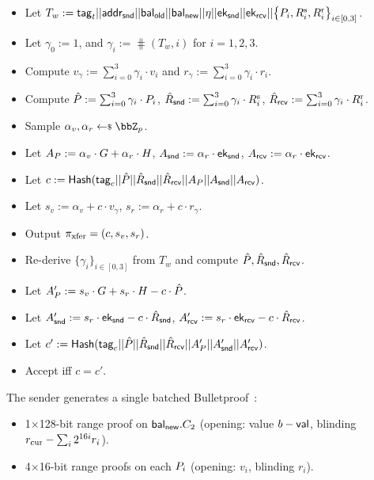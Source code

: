 \two
{}
%
\begin{itemize}[itemsep=.5pt]
    \item Let $T_w := \mathsf{tag}_t \vert\vert {\ensuremath{\mathsf{addr}}}_{\sf snd} \vert\vert \mathsf{bal}_{\mathsf{old}} \vert\vert \mathsf{bal}_{\mathsf{new}} \vert\vert \eta \vert\vert \textsf{ek}_{\mathsf{snd}} \vert\vert \textsf{ek}_{\mathsf{rcv}} \vert\vert \bigl\{P_{i}, R^{\rm s}_{i}, R^{\rm r}_{i}\bigr\}_{i \in [0,3]}$.
    \item Let $\gamma_0 := 1$, and $\gamma_i := \hash(T_w, i)$ for $i = 1, 2, 3$.
    \item Compute $v_\gamma := \sum_{i=0}^{3} \gamma_i \cdot v_i$ and $r_\gamma := \sum_{i=0}^{3} \gamma_i \cdot r_i$.
    \item Compute $\hat{P} := \sum_{i=0}^{3} \gamma_i \cdot P_{i}$, $\hat{R}_{\sf snd} := \sum_{i=0}^{3} \gamma_i \cdot R^{\rm s}_{i}$, $\hat{R}_{\sf rcv} := \sum_{i=0}^{3} \gamma_i \cdot R^{\rm r}_{i}$.
\end{itemize}

\two
{}
%
\begin{itemize}[itemsep=.5pt]
    \item Sample $\alpha_v, \alpha_r \getsr \Z_p$.
    \item Let $A_P := \alpha_v \cdot G + \alpha_r \cdot H$, $A_{\sf snd} := \alpha_r \cdot \textsf{ek}_{\mathsf{snd}}$, $A_{\sf rcv} := \alpha_r \cdot \textsf{ek}_{\mathsf{rcv}}$.
    \item Let $c := \mathsf{Hash}(\mathsf{tag}_c \vert\vert \hat{P} \vert\vert \hat{R}_{\sf snd} \vert\vert \hat{R}_{\sf rcv} \vert\vert A_P \vert\vert A_{\sf snd} \vert\vert A_{\sf rcv})$.
    \item Let $s_v := \alpha_v + c \cdot v_\gamma$, $s_r := \alpha_r + c \cdot r_\gamma$.
    \item Output $\pi_{\rm xfer} = (c, s_v, s_r)$.
\end{itemize}

\two
{}
\begin{itemize}[itemsep=0.5pt]
    \item Re-derive $\{\gamma_i\}_{i \in [0,3]}$ from $T_w$ and compute $\hat{P}, \hat{R}_{\sf snd}, \hat{R}_{\sf rcv}$.
    \item Let $A'_P := s_v \cdot G + s_r \cdot H - c \cdot \hat{P}$.
    \item Let $A'_{\sf snd} := s_r \cdot \textsf{ek}_{\mathsf{snd}} - c \cdot \hat{R}_{\sf snd}$, $A'_{\sf rcv} := s_r \cdot \textsf{ek}_{\mathsf{rcv}} - c \cdot \hat{R}_{\sf rcv}$.
    \item Let $c' := \mathsf{Hash}(\mathsf{tag}_c \vert\vert \hat{P} \vert\vert \hat{R}_{\sf snd} \vert\vert \hat{R}_{\sf rcv} \vert\vert A'_P \vert\vert A'_{\sf snd} \vert\vert A'_{\sf rcv})$.
    \item Accept iff $c = c'$.
\end{itemize}

\one
{}
The sender generates a single batched Bulletproof~\cite{bunz2018bulletproofs}:
%
\begin{itemize}[itemsep=.5pt]
    \item 1$\times$128-bit range proof on $\mathsf{bal}_{\mathsf{new}}.C_2$ (opening: value $b - \mathsf{val}$, blinding $r_{\rm cur} - \sum_i 2^{16i} r_i$).
    \item 4$\times$16-bit range proofs on each $P_{i}$ (opening: $v_i$, blinding $r_i$).
\end{itemize}
%

